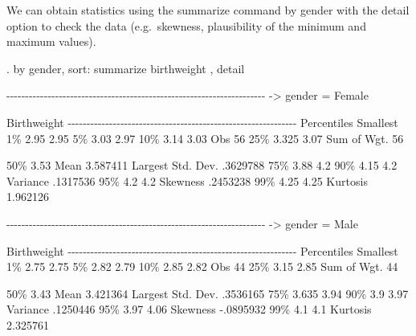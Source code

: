\documentclass[
]{memoir}
\newenvironment{Shaded}{\begin{snugshade}}{\end{snugshade}}
\newcommand{\NormalTok}[1]{#1}
\begin{document}
We can obtain statistics using the summarize command by gender with the detail option to check the data (e.g.~skewness, plausibility of the minimum and maximum values).

\begin{Shaded}
\begin{Highlighting}[]
\NormalTok{. by gender, sort: summarize birthweight , detail}

\NormalTok{{-}{-}{-}{-}{-}{-}{-}{-}{-}{-}{-}{-}{-}{-}{-}{-}{-}{-}{-}{-}{-}{-}{-}{-}{-}{-}{-}{-}{-}{-}{-}{-}{-}{-}{-}{-}{-}{-}{-}{-}{-}{-}{-}{-}{-}{-}{-}{-}{-}{-}{-}{-}{-}{-}{-}{-}{-}{-}{-}{-}{-}{-}{-}{-}{-}{-}{-}{-}{-}}
\NormalTok{{-}\textgreater{} gender = Female}

\NormalTok{                         Birthweight}
\NormalTok{{-}{-}{-}{-}{-}{-}{-}{-}{-}{-}{-}{-}{-}{-}{-}{-}{-}{-}{-}{-}{-}{-}{-}{-}{-}{-}{-}{-}{-}{-}{-}{-}{-}{-}{-}{-}{-}{-}{-}{-}{-}{-}{-}{-}{-}{-}{-}{-}{-}{-}{-}{-}{-}{-}{-}{-}{-}{-}{-}{-}{-}}
\NormalTok{      Percentiles      Smallest}
\NormalTok{ 1\%         2.95           2.95}
\NormalTok{ 5\%         3.03           2.97}
\NormalTok{10\%         3.14           3.03       Obs                  56}
\NormalTok{25\%        3.325           3.07       Sum of Wgt.          56}

\NormalTok{50\%         3.53                      Mean           3.587411}
\NormalTok{                        Largest       Std. Dev.      .3629788}
\NormalTok{75\%         3.88            4.2}
\NormalTok{90\%         4.15            4.2       Variance       .1317536}
\NormalTok{95\%          4.2            4.2       Skewness       .2453238}
\NormalTok{99\%         4.25           4.25       Kurtosis       1.962126}

\NormalTok{{-}{-}{-}{-}{-}{-}{-}{-}{-}{-}{-}{-}{-}{-}{-}{-}{-}{-}{-}{-}{-}{-}{-}{-}{-}{-}{-}{-}{-}{-}{-}{-}{-}{-}{-}{-}{-}{-}{-}{-}{-}{-}{-}{-}{-}{-}{-}{-}{-}{-}{-}{-}{-}{-}{-}{-}{-}{-}{-}{-}{-}{-}{-}{-}{-}{-}{-}{-}{-}}
\NormalTok{{-}\textgreater{} gender = Male}

\NormalTok{                         Birthweight}
\NormalTok{{-}{-}{-}{-}{-}{-}{-}{-}{-}{-}{-}{-}{-}{-}{-}{-}{-}{-}{-}{-}{-}{-}{-}{-}{-}{-}{-}{-}{-}{-}{-}{-}{-}{-}{-}{-}{-}{-}{-}{-}{-}{-}{-}{-}{-}{-}{-}{-}{-}{-}{-}{-}{-}{-}{-}{-}{-}{-}{-}{-}{-}}
\NormalTok{      Percentiles      Smallest}
\NormalTok{ 1\%         2.75           2.75}
\NormalTok{ 5\%         2.82           2.79}
\NormalTok{10\%         2.85           2.82       Obs                  44}
\NormalTok{25\%         3.15           2.85       Sum of Wgt.          44}

\NormalTok{50\%         3.43                      Mean           3.421364}
\NormalTok{                        Largest       Std. Dev.      .3536165}
\NormalTok{75\%        3.635           3.94}
\NormalTok{90\%          3.9           3.97       Variance       .1250446}
\NormalTok{95\%         3.97           4.06       Skewness      {-}.0895932}
\NormalTok{99\%          4.1            4.1       Kurtosis       2.325761}
\end{Highlighting}
\end{Shaded}
\end{document}
